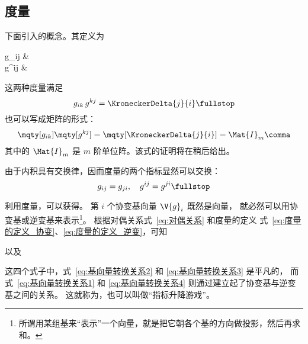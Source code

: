 \subsection{度量} \label{subsec:度量}
下面引入的概念。其定义为
\begin{braceEq}
	g_{ij} & {} \comma 
	\label{eq:度量的定义_协变} \\
	g^{ij} & {} \fullstop
	\label{eq:度量的定义_逆变}
\end{braceEq}
这两种度量满足
\begin{equation}
	g_{ik}\,g^{kj} = \KroneckerDelta{j}{i} \fullstop
	\label{eq:度量之积}
\end{equation}
也可以写成矩阵的形式：
\begin{equation}
	\mqty[g_{ik}]\mqty[g^{kj}]
	=\mqty[\KroneckerDelta{j}{i}]=\Mat{I}_m \comma
\end{equation}
其中的 $\Mat{I}_m$ 是 $m$ 阶单位阵。该式的证明将在稍后给出。

由于内积具有交换律，因而度量的两个指标显然可以交换：
\begin{equation}
	g_{ij}=g_{ji}, \quad g^{ij}=g^{ji} \fullstop
\end{equation}

利用度量，可以获得。
第 $i$ 个协变基向量 $\V{g}_i$ 既然是向量，
就必然可以用协变基或逆变基来表示\footnote{%
	所谓用某组基来“表示”一个向量，就是把它朝各个基的方向做投影，然后再求和。}。
根据对偶关系式~\eqref{eq:对偶关系} 和度量的定义
式~\eqref{eq:度量的定义_协变}、\eqref{eq:度量的定义_逆变}，可知
以及
这四个式子中，式~\eqref{eq:基向量转换关系2} 和
\eqref{eq:基向量转换关系3} 是平凡的，
而式~\eqref{eq:基向量转换关系1} 和 \eqref{eq:基向量转换关系4}
则通过建立起了协变基与逆变基之间的关系。
这就称为，也可以叫做“指标升降游戏”。

